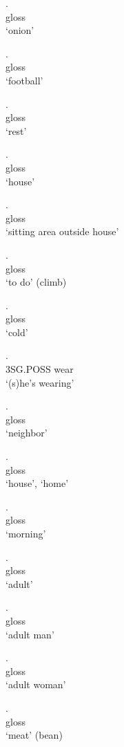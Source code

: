 \documentclass{assets/fieldnotes}
\begin{document}
\exg.  \\
gloss \\
`onion'

\exg.  \\
gloss \\
`football'

\exg.  \\
gloss \\
`rest'

\exg.  \\
gloss \\
`house'


\exg.  \\
gloss \\
`sitting area outside house' 

\exg.  \\
gloss \\
`to do' (climb)

\exg.  \\
gloss \\
`cold' 

\exg.  \\
3SG.POSS wear \\
`(s)he's wearing' 

\exg.  \\
gloss \\
`neighbor'

\exg.  \\
gloss \\
`house', `home' 

\exg.  \\
gloss \\
`morning' 

\exg.  \\
gloss \\
`adult' 

\exg.  \\
gloss \\
`adult man' 

\exg.  \\
gloss \\
`adult woman' 

\exg.  \\
gloss \\
`meat' (bean)
\end{document}
